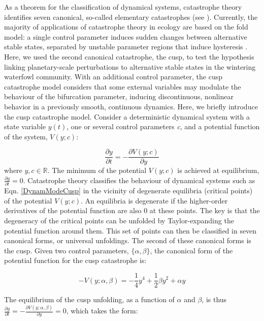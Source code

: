 \documentclass[11pt]{article}
\newcommand{\R}{\mathbb{R}}
\begin{document}
As a theorem for the classification of dynamical systems, catastrophe theory identifies seven canonical, so-called elementary catastrophes (see \cite{Thom1975,Arnold1994}). Currently, the majority of applications of catastrophe theory in ecology are based on the fold model: a single control parameter induces sudden changes between alternative stable states, separated by unstable parameter regions that induce hysteresis \cite{Dakos2019,Scheffer2009a}. Here, we used the second canonical catastrophe, the cusp, to test the hypothesis linking planetary-scale perturbations to alternative stable states in the wintering waterfowl community. With an additional control parameter, the cusp catastrophe model considers that some external variables may modulate the behaviour of the bifurcation parameter, inducing discontinuous, nonlinear behavior in a previously smooth, continuous dynamics. Here, we briefly introduce the cusp catastrophe model. Consider a deterministic dynamical system with a state variable $ y(t) $, one or several control parameters \textit{c}, and a potential function of the system, $ V(y; c) $:

\begin{equation}\label{DynamModeCusp}
	\frac{\partial y}{\partial t} = - \frac{\partial V(y; c)}{\partial y}
\end{equation}
where $y, c \in \R$. The minimum of the potential $ V(y; c) $ is achieved at equilibrium, $ \frac{\partial y}{\partial t} = 0 $. Catastrophe theory classifies the behaviour of dynamical systems such as Eqn. \ref{DynamModeCusp} in the vicinity of degenerate equilibria (critical points) of the potential $ V(y; c) $. An equilibria is degenerate if the higher-order derivatives of the potential function are also 0 at these points. The key is that the degeneracy of the critical points can be unfolded by Taylor-expanding the potential function around them. This set of points can then be classified in seven canonical forms, or universal unfoldings. The second of these canonical forms is the cusp. Given two control parameters, $ \{\alpha, \beta\} $, the canonical form of the potential function for the cusp catastrophe is:

\begin{equation}\label{CanonicalPotential}
	-V(y; \alpha, \beta) =  - \frac{1}{4} y^4 + \frac{1}{2}\beta y^2 + \alpha y 
\end{equation}

The equilibrium of the cusp unfolding, as a function of $ \alpha $ and $ \beta $, is thus $ \frac{\partial y}{\partial t} = - \frac{\partial V(y; \alpha,\beta)}{\partial y} = 0$, which takes the form:
\end{document}
